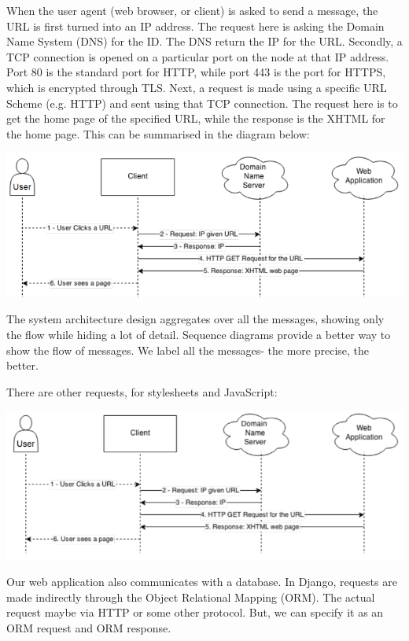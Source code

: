 \documentclass[a4paper, openany]{memoir}
\begin{document}
\noindent When the user agent (web browser, or client) is asked to send a message, the URL is first turned into an IP address. The request here is asking the Domain Name System (DNS) for the ID. The DNS return the IP for the URL. Secondly, a TCP connection is opened on a particular port on the node at that IP address. Port 80 is the standard port for HTTP, while port 443 is the port for HTTPS, which is encrypted through TLS. Next, a request is made using a specific URL Scheme (e.g. HTTP) and sent using that TCP connection. The request here is to get the home page of the specified URL, while the response is the XHTML for the home page. This can be summarised in the diagram below:
\begin{center}
    \includegraphics[scale=0.6]{src/L18I1.PNG}
\end{center}
The system architecture design aggregates over all the messages, showing only the flow while hiding a lot of detail. Sequence diagrams provide a better way to show the flow of messages. We label all the messages- the more precise, the better.

\noindent There are other requests, for stylesheets and JavaScript:
\begin{center}
    \includegraphics[scale=0.7]{src/L18I2.PNG}
\end{center}
Our web application also communicates with a database. In Django, requests are made indirectly through the Object Relational Mapping (ORM). The actual request maybe via HTTP or some other protocol. But, we can specify it as an ORM request and ORM response.
\end{document}

